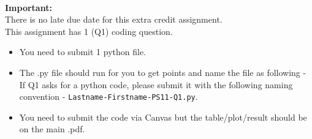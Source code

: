 \documentclass[12pt]{article}
\theoremstyle{remark}
\begin{document}
\hrulefill
\pagebreak
\\
\textbf{Important:} \\
There is no late due date for this extra credit assignment.
\\This assignment has 1 (Q1) coding question. 
\begin{itemize}
    \item You need to submit 1 python file.
    \item The .py file should run for you to get points and name the file as following - \\
If Q1 asks for a python code, please submit it with the following naming convention - \texttt{Lastname-Firstname-PS11-Q1.py}.
\item You need to submit the code via Canvas but the table/plot/result should be on the main .pdf.
\end{itemize}
\pagebreak
\end{document}
